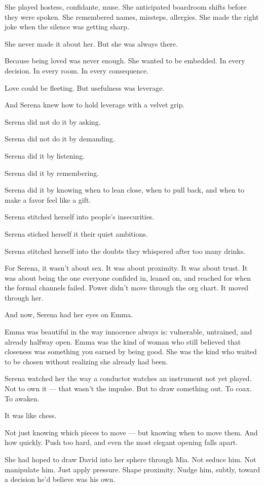 She played hostess, confidante, muse.
She anticipated boardroom shifts before they were spoken.
She remembered names, missteps, allergies.
She made the right joke when the silence was getting sharp.

She never made it about her.
But she was always there.

Because being loved was never enough.
She wanted to be embedded.
In every decision.
In every room.
In every consequence.

Love could be fleeting.
But usefulness was leverage.

And Serena knew how to hold leverage with a velvet grip.

Serena did not do it by asking. 

Serena did not do it by demanding.  

Serena did it by listening. 

Serena did it by remembering. 

Serena did it by knowing when to lean close, when to pull back, and when to make a favor feel like a gift.

Serena stitched herself into people’s insecurities. 

Serena stiched herself it their quiet ambitions. 

Serena stitched herself into the doubts they whispered after too many drinks.  

For Serena, it wasn’t about sex.  
It was about proximity.  
It was about trust.  
It was about being the one everyone confided in, 
leaned on, and reached for when the formal channels failed.
Power didn’t move through the org chart.  
It moved through her.  

And now, Serena had her eyes on Emma.

Emma was beautiful in the way innocence always is: vulnerable, untrained, and already halfway open.
Emma was the kind of woman who still believed that closeness was something you earned by being good.
She was the kind who waited to be chosen without realizing she already had been.

Serena watched her the way a conductor watches an instrument not yet played.
Not to own it — that wasn’t the impulse.
But to draw something out. To coax. To awaken.

It was like chess.

Not just knowing which pieces to move —
but knowing when to move them.
And how quickly.
Push too hard, and even the most elegant opening falls apart.

She had hoped to draw David into her sphere through Mia.
Not seduce him. Not manipulate him.
Just apply pressure. Shape proximity. Nudge him, subtly, toward a decision he’d believe was his own.

